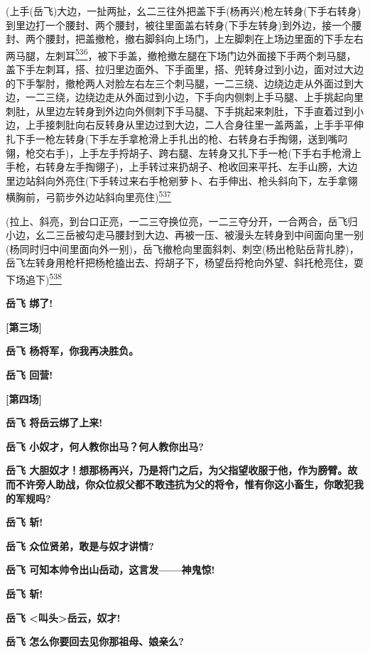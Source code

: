 (上手(岳飞)大边，一扯两扯，幺二三往外把盖下手(杨再兴)枪左转身(下手右转身)到里边打一个腰封、两个腰封，被往里面盖右转身(下手左转身)到外边，接一个腰封、两个腰封，把盖撤枪，撤右脚斜向上场门，上左脚刺在上场边里面的下手左右两马腿，左刺耳\protect\hyperlink{fn536}{\textsuperscript{536}}，被下手盖，撤枪撤左腿在下场门边外面接下手两个刺马腿，盖下手左刺耳，搭、拉归里边面外、下手面里，搭、兜转身过到小边，面对过大边的下手掣肘，撤枪两人对脸左右左三个刺马腿，一二三绕、边绕边走从外面过到大边，一二三绕，边绕边走从外面过到小边，下手向内侧刺上手马腿、上手挑起向里刺肚，从里边左转身到外边向外侧刺下手马腿、下手挑起来刺肚，下手直着过到小边，上手接刺肚向右反转身从里边过到大边，二人合身往里一盖两盖，上手手平伸扎下手一枪左转身(下手左手拿枪滑上手扎出的枪、右转身右手掏翎，送到嘴叼翎，枪交右手)，上手左手捋胡子、跨右腿、左转身又扎下手一枪(下手右手枪滑上手枪，右转身左手掏翎子)，上手转过来扔胡子、枪收回来平托、左手山膀，大边里边站斜向外亮住(下手转过来右手枪剜萝卜、右手伸出、枪头斜向下，左手拿翎横胸前，弓箭步外边站斜向里亮住)\protect\hyperlink{fn537}{\textsuperscript{537}}

(拉上、斜亮，到台口正亮，一二三夺换位亮，一二三夺分开，一合两合，岳飞归小边，幺二三岳被勾走马腰封到大边、再被一压、被漫头左转身到中间面向里一别(杨同时归中间里面向外一别)，岳飞撤枪向里面斜刺、刺空(杨出枪贴岳背扎脖)，岳飞左转身用枪杆把杨枪搕出去、捋胡子下，杨望岳捋枪向外望、斜托枪亮住，耍下场追下)\protect\hyperlink{fn538}{\textsuperscript{538}}

\textbf{岳飞 绑了!}

\textbf{{[}第三场{]}}

\textbf{岳飞 杨将军，你我再决胜负。}

\textbf{岳飞 回营!}

\textbf{{[}第四场{]}}

\textbf{岳飞 将岳云绑了上来!}

\textbf{岳飞 小奴才，何人教你出马？何人教你出马?}

\textbf{岳飞
大胆奴才！想那杨再兴，乃是将门之后，为父指望收服于他，作为膀臂。故而不许旁人助战，你众位叔父都不敢违抗为父的将令，惟有你这小畜生，你敢犯我的军规吗?}

\textbf{岳飞 斩!}

\textbf{岳飞 众位贤弟，敢是与奴才讲情?}

\textbf{岳飞 可知本帅令出山岳动，这言发------神鬼惊!}

\textbf{岳飞 斩!}

\textbf{岳飞 \textless{}叫头\textgreater{}岳云，奴才!}

\textbf{岳飞 怎么你要回去见你那祖母、娘亲么?}

